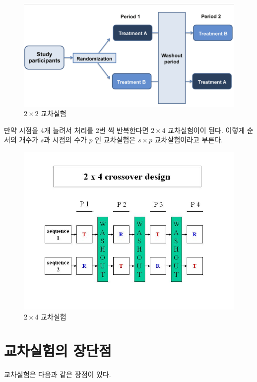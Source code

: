 \documentclass[
]{book}
\theoremstyle{definition}
\theoremstyle{definition}
\theoremstyle{definition}
\theoremstyle{remark}
\begin{document}
\begin{figure}
\centering
\includegraphics{cross1.png}
\caption{\(2 \times 2\) 교차실험}
\end{figure}

만약 시점을 4개 늘려서 처리를 2번 씩 반복한다면 \(2 \times 4\) 교차실험이이 된다. 이렇게 순서의 개수가 \(s\)과 시점의 수가 \(p\) 인 교차실험은 \(s \times p\) 교차살험이라고 부른다.

\begin{figure}
\centering
\includegraphics{design24.jpg}
\caption{\(2 \times 4\) 교차실험}
\end{figure}

\hypertarget{uxad50uxcc28uxc2e4uxd5d8uxc758-uxc7a5uxb2e8uxc810}{%
\section{교차실험의 장단점}\label{uxad50uxcc28uxc2e4uxd5d8uxc758-uxc7a5uxb2e8uxc810}}

교차실험은 다음과 같은 장점이 있다.
\end{document}
